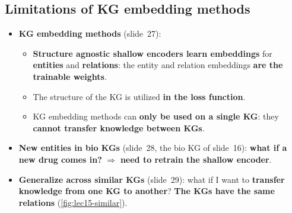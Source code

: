 \subsection{Limitations of KG embedding methods}\label{sec:lec15-limits}

\begin{itemize}
  \item \textbf{KG embedding methods} (slide~27):
    \begin{itemize}
      \item \textbf{Structure agnostic shallow encoders learn embeddings} for
        \textbf{entities} and \textbf{relations}: the entity and relation embeddings
        \textbf{are the trainable weights}.
      \item The structure of the KG is utilized \textbf{in the loss function}.
      \item KG embedding methods can \textbf{only be used on a single KG}: they
        \textbf{cannot transfer knowledge between KGs}.
    \end{itemize}
  \item \textbf{New entities in bio KGs} (slide~28, the bio KG of slide~16): \textbf{what
    if a new drug comes in?} $\Rightarrow$ \textbf{need to retrain the shallow
    encoder}.
  \item \textbf{Generalize across similar KGs} (slide~29): what if I want to
    \textbf{transfer knowledge from one KG to another}? \textbf{The KGs have the same
    relations} (\cref{fig:lec15-similar}).
\end{itemize}

